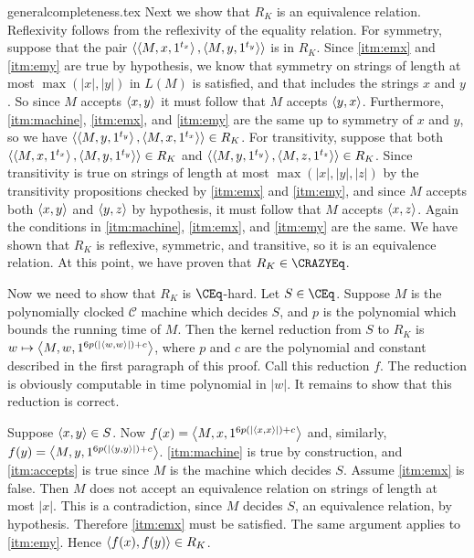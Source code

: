 \begin{filecontents}{generalcompleteness.tex}
  Next we show that $R_K$ is an equivalence relation.
  Reflexivity follows from the reflexivity of the equality relation.
  For symmetry, suppose that the pair $\pair{\triple{M}{x}{1^{t_x}}}{\triple{M}{y}{1^{t_y}}}$ is in $R_K$.
  Since \ref{itm:emx} and \ref{itm:emy} are true by hypothesis, we know that symmetry on strings of length at most $\max(|x|, |y|)$ in $L(M)$ is satisfied, and that includes the strings $x$ and $y$.
  So since $M$ accepts $\pair{x}{y}$ it must follow that $M$ accepts $\pair{y}{x}$.
  Furthermore, \ref{itm:machine}, \ref{itm:emx}, and \ref{itm:emy} are the same up to symmetry of $x$ and $y$, so we have $\pair{\triple{M}{y}{1^{t_y}}}{\triple{M}{x}{1^{t_x}}}\in R_K$.
  For transitivity, suppose that both $\pair{\triple{M}{x}{1^{t_x}}}{\triple{M}{y}{1^{t_y}}}\in R_K$ and $\pair{\triple{M}{y}{1^{t_y}}}{\triple{M}{z}{1^{t_z}}}\in R_K$.
  Since transitivity is true on strings of length at most $\max(|x|, |y|, |z|)$ by the transitivity propositions checked by \ref{itm:emx} and \ref{itm:emy}, and since $M$ accepts both $\pair{x}{y}$ and $\pair{y}{z}$ by hypothesis, it must follow that $M$ accepts $\pair{x}{z}$.
  Again the conditions in \ref{itm:machine}, \ref{itm:emx}, and \ref{itm:emy} are the same.
  We have shown that $R_K$ is reflexive, symmetric, and transitive, so it is an equivalence relation.
  At this point, we have proven that $R_K\in\CRAZYEq$.

  Now we need to show that $R_K$ is $\CEq$-hard.
  Let $S\in\CEq$.
  Suppose $M$ is the polynomially clocked $\mathcal{C}$ machine which decides $S$, and $p$ is the polynomial which bounds the running time of $M$.
  Then the kernel reduction from $S$ to $R_K$ is $w\mapsto\triple{M}{w}{1^{6p(|\pair{w}{w}|)+c}}$, where $p$ and $c$ are the polynomial and constant described in the first paragraph of this proof.
  Call this reduction $f$.
  The reduction is obviously computable in time polynomial in $|w|$.
  It remains to show that this reduction is correct.

  Suppose $\pair{x}{y}\in S$.
  Now $f(x)=\triple{M}{x}{1^{6p(|\pair{x}{x}|)+c}}$ and, similarly, $f(y)=\triple{M}{y}{1^{6p(|\pair{y}{y}|)+c}}$.
  \ref{itm:machine} is true by construction, and \ref{itm:accepts} is true since $M$ is the machine which decides $S$.
  Assume \ref{itm:emx} is false.
  Then $M$ does not accept an equivalence relation on strings of length at most $|x|$.
  This is a contradiction, since $M$ decides $S$, an equivalence relation, by hypothesis.
  Therefore \ref{itm:emx} must be satisfied.
  The same argument applies to \ref{itm:emy}.
  Hence $\pair{f(x)}{f(y)}\in R_K$.


\end{filecontents}
